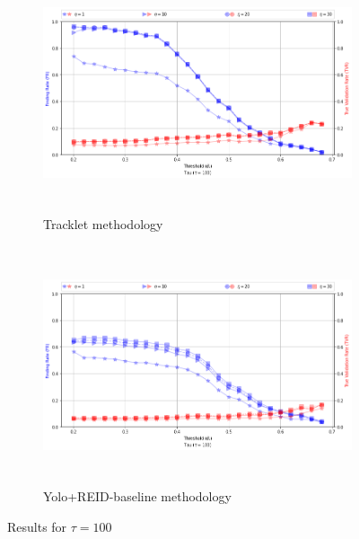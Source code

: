 \documentclass{article}
\begin{document}
\begin{figure}[H]
    \begin{subfigure}{0.9\textwidth}
        \includegraphics[width=12cm, height=7cm]{images_results/tracklet_tau100_norm.png} 
        \caption{Tracklet methodology}
        \label{fig:subim1}
    \end{subfigure}
    
    \begin{subfigure}{0.9\textwidth}
        \includegraphics[width=12cm, height=7cm]{images_results/yolo_tau100_norm.png}
        \caption{Yolo+REID-baseline methodology}
        \label{fig:subim2}
    \end{subfigure}

\caption{Results for $\tau = 100$}
\label{fig:tracklet_tau100_norm}
\end{figure}
\end{document}

